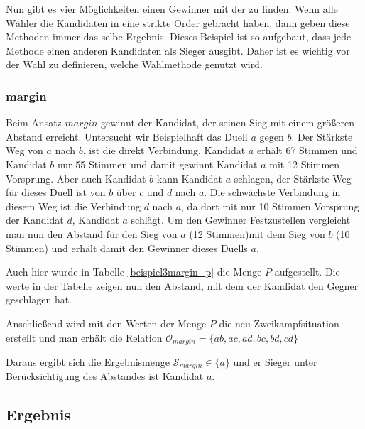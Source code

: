 Nun gibt es vier Möglichkeiten einen Gewinner mit der \schulze zu finden. Wenn alle Wähler die Kandidaten in eine strikte Order gebracht haben, dann geben diese Methoden immer das selbe Ergebnis. Dieses Beispiel ist so aufgebaut, dass jede Methode einen anderen Kandidaten als Sieger ausgibt. Daher ist es wichtig vor der Wahl zu definieren, welche Wahlmethode genutzt wird.

\subsubsection[a]{margin}
\label{sec:margin}
Beim Ansatz $margin$ gewinnt der Kandidat, der seinen Sieg mit einem größeren Abstand erreicht. 
Untersucht wir Beispielhaft das Duell $a$ gegen $b$. Der Stärkste Weg von $a$ nach $b$, ist die direkt Verbindung, Kandidat $a$ erhält 67 Stimmen und Kandidat $b$ nur 55 Stimmen und damit gewinnt Kandidat $a$ mit 12 Stimmen Vorsprung. 
Aber auch Kandidat $b$ kann Kandidat $a$ schlagen, der Stärkste Weg für dieses Duell ist von $b$ über $c$ und $d$ nach $a$. Die schwächste Verbindung in diesem Weg ist die Verbindung $d$ nach $a$, da dort mit nur 10 Stimmen Vorsprung der Kandidat $d$, Kandidat $a$ schlägt.
Um den Gewinner Festzustellen vergleicht man nun den Abstand für den Sieg von $a$ (12 Stimmen)mit dem Sieg von $b$ (10 Stimmen) und erhält damit den Gewinner dieses Duells $a$.

Auch hier wurde in Tabelle \ref{beispiel3margin_p} die Menge $P$ aufgestellt. Die werte in der Tabelle zeigen nun den Abstand, mit dem der Kandidat den Gegner geschlagen hat.



Anschließend wird mit den Werten der Menge $P$ die neu Zweikampfsituation erstellt und man erhält die Relation $\mathcal{O}_{margin} = \{ ab, ac,ad,bc,bd,cd \}$

Daraus ergibt sich die Ergebnismenge $\mathcal{S}_{margin} \in \{ a\}$ und er Sieger unter Berücksichtigung des Abstandes ist Kandidat $a$.

\subsection{Ergebnis} 
\label{sec:ergebnis3}

